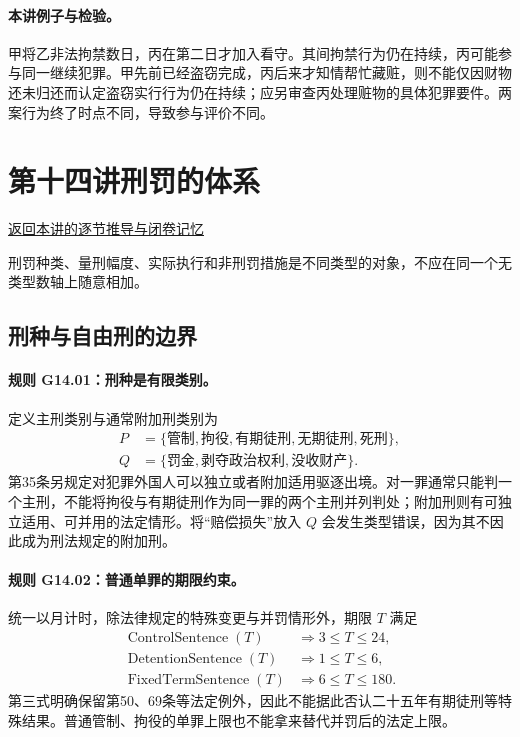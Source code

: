 \paragraph{本讲例子与检验。}
甲将乙非法拘禁数日，丙在第二日才加入看守。其间拘禁行为仍在持续，丙可能参与同一继续犯罪。甲先前已经盗窃完成，丙后来才知情帮忙藏赃，则不能仅因财物还未归还而认定盗窃实行行为仍在持续；应另审查丙处理赃物的具体犯罪要件。两案行为终了时点不同，导致参与评价不同。

\section{第十四讲\quad 刑罚的体系}

\label{ref:lecture:14}

\noindent\hyperref[lecture:14]{返回本讲的逐节推导与闭卷记忆}

刑罚种类、量刑幅度、实际执行和非刑罚措施是不同类型的对象，不应在同一个无类型数轴上随意相加。

\subsection{刑种与自由刑的边界}
\paragraph{规则 G14.01：刑种是有限类别。}
定义主刑类别与通常附加刑类别为
\[
\begin{aligned}
P&=\{\text{管制},\text{拘役},\text{有期徒刑},\text{无期徒刑},\text{死刑}\},\\
Q&=\{\text{罚金},\text{剥夺政治权利},\text{没收财产}\}.
\end{aligned}
\]
第35条另规定对犯罪外国人可以独立或者附加适用驱逐出境。对一罪通常只能判一个主刑，不能将拘役与有期徒刑作为同一罪的两个主刑并列判处；附加刑则有可独立适用、可并用的法定情形。将“赔偿损失”放入 $Q$ 会发生类型错误，因为其不因此成为刑法规定的附加刑。

\paragraph{规则 G14.02：普通单罪的期限约束。}
统一以月计时，除法律规定的特殊变更与并罚情形外，期限 $T$ 满足
\[
\begin{aligned}
\operatorname{ControlSentence}(T)&\Longrightarrow3\le T\le24,\\
\operatorname{DetentionSentence}(T)&\Longrightarrow1\le T\le6,\\
\operatorname{FixedTermSentence}(T)&\Longrightarrow6\le T\le180.
\end{aligned}
\]
第三式明确保留第50、69条等法定例外，因此不能据此否认二十五年有期徒刑等特殊结果。普通管制、拘役的单罪上限也不能拿来替代并罚后的法定上限。


